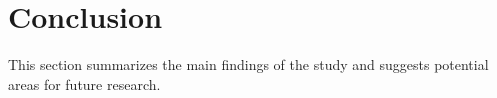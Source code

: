 \section{Conclusion}
\label{sec:conclusion}

This section summarizes the main findings of the study and suggests potential areas for future research.
